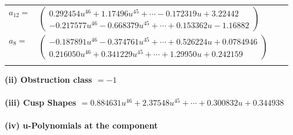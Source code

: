 \documentclass[1p]{elsarticle_modified}
\theoremstyle{definition}
\begin{document}
\begin{tabular}{m{7pt} m{180pt} m{7pt} m{180pt} }
\flushright $a_{12}=$&$\begin{pmatrix}0.292454 u^{46}+1.17496 u^{45}+\cdots-0.172319 u+3.22442\\-0.217577 u^{46}-0.668379 u^{45}+\cdots+0.153362 u-1.16882\end{pmatrix}$ \\
\flushright $a_{8}=$&$\begin{pmatrix}-0.187891 u^{46}-0.374761 u^{45}+\cdots+0.526224 u+0.0784946\\0.216050 u^{46}+0.341229 u^{45}+\cdots+1.29950 u+0.242159\end{pmatrix}$\\&\end{tabular}
\flushleft \textbf{(ii) Obstruction class $= -1$}\\~\\
\flushleft \textbf{(iii) Cusp Shapes $= 0.884631 u^{46}+2.37548 u^{45}+\cdots+0.300832 u+0.344938$}\\~\\
\newpage\renewcommand{\arraystretch}{1}
\flushleft \textbf{(iv) u-Polynomials at the component}\newline \\
\end{document}
